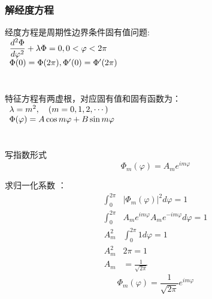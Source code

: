 \begin{frame}
	\frametitle{解经度方程}
	经度方程是周期性边界条件固有值问题:\\
	$
	\begin{array}{l}
		\dfrac{d^{2} \Phi}{d \varphi^{2}}+\lambda \Phi=0,0<\varphi<2 \pi \\ \vspace{1cm}
		\Phi(0)=\Phi(2 \pi), \Phi^{\prime}(0)=\Phi^{\prime}(2 \pi)
	\end{array}
	$\\
	特征方程有两虚根，对应固有值和固有函数为：\\
	$
	\begin{array}{l}
		\lambda=m^2, ~~~ (m=0,1,2,\cdots) \\ \vspace{1cm}
		\Phi(\varphi)=A\cos m\varphi+B\sin m\varphi
	\end{array}
	$\\
	写指数形式
	\begin{equation*}
		\Phi_m (\varphi)=A_m e^{im\varphi}
	\end{equation*}	
\end{frame}	

\begin{frame}
	求归一化系数 ：
	\begin{equation*}
	\begin{split}
		\int_{0}^{2\pi} & |\Phi_m (\varphi)|^2 d\varphi = 1 \\
		\int_{0}^{2\pi} & A_m e^{im\varphi} A_m e^{-im\varphi} d\varphi = 1 \\
		A^2_m &\int_{0}^{2\pi} 1 d\varphi = 1 \\
		A^2_m &2\pi = 1 \\
		A_m&=\frac{1}{\sqrt{2\pi}} 
	\end{split}
	\end{equation*}	
	\begin{equation*}
		\Phi_m (\varphi)=\frac{1}{\sqrt{2\pi}} e^{im\varphi}
	\end{equation*}	
\end{frame}	

